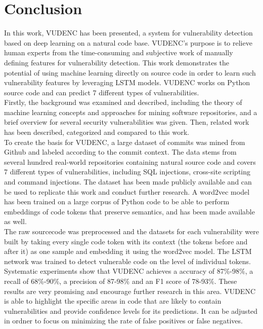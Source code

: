 \documentclass[
a4paper,
pagesize,
pdftex,
12pt,
twoside, %
BCOR=5mm, %
ngerman,
fleqn,
final,
]{scrartcl}
\begin{document}
	
	
	
	
	
	
	\newpage
	\setcounter{secnumdepth}{0} %
	\section{Conclusion}
	In this work, VUDENC has been presented, a system for vulnerability detection based on deep learning on a natural code base. VUDENC's purpose is to relieve human experts from the time-consuming and subjective work of manually defining features for vulnerability detection. This work demonstrates the potential of using machine learning directly on source code in order to learn such vulnerability features by leveraging LSTM models. VUDENC works on Python source code and can predict 7 different types of vulnerabilities.\\
	Firstly, the background was examined and described, including the theory of machine learning concepts and approaches for mining software repositories, and a brief overview for several security vulnerabilities was given. Then, related work has been described, categorized and compared to this work.\\
	To create the basis for VUDENC, a large dataset of commits was mined from Github and labeled according to the commit context. The data stems from several hundred real-world repositories containing natural source code and covers 7 different types of vulnerabilities, including SQL injections, cross-site scripting and command injections. The dataset has been made publicly available and can be used to replicate this work and conduct further research. A word2vec model has been trained on a large corpus of Python code to be able to perform embeddings of code tokens that preserve semantics, and has been made available as well.\\
	The raw sourcecode was preprocessed and the datasets for each vulnerability were built by taking every single code token with its context (the tokens before and after it) as one sample and embedding it using the word2vec model. The LSTM network was trained to detect vulnerable code on the level of individual tokens.\\
	Systematic experiments show that VUDENC achieves a accuracy of 87\%-98\%, a recall of 68\%-90\%, a precision of 87-98\% and an F1 score of 78-93\%.  These results are very promising and encourage further research in this area. VUDENC is able to highlight the specific areas in code that are likely to contain vulnerabilities and provide confidence levels for its predictions. It can be adjusted in ordner to focus on minimizing the rate of false positives or false negatives. \\
\end{document}
